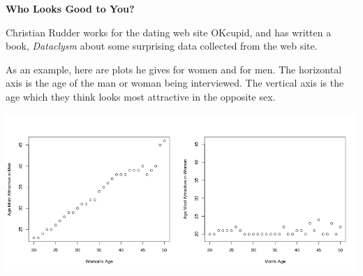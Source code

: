 \def\theTopic{Correlation/Slope }
\def\dayNum{17 }

\begin{center}

{\bf {\large Who Looks Good to You?}}
\end{center}


Christian Rudder works for the dating web site OKcupid, and has
written a book, {\it Dataclysm} about some surprising data 
collected from the web site.

As an example, here are plots he gives for women and for men.
The horizontal axis is the age of the man or woman being
interviewed. The vertical axis is the age which they think looks most
attractive in the opposite sex.\vspace{-.5cm}

\includegraphics[width=\linewidth]{../plots/attractiveAges.png}

